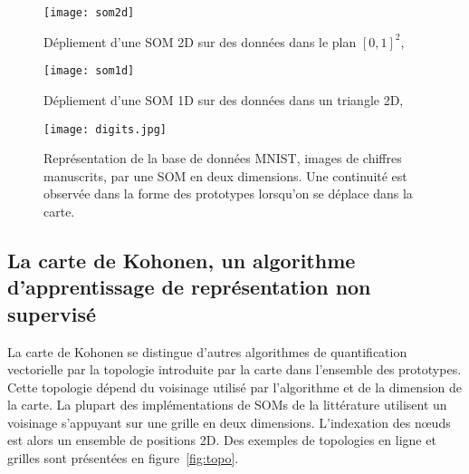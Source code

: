 \documentclass[../main]{subfiles}
\begin{document}
    \begin{figure}
        \centering
        \texttt{[image: som2d]}
        \caption{Dépliement d'une SOM 2D sur des données dans le plan $[0,1]^2$, \cite{Kohonen1995SelfOrganizingM} \label{fig:som2d}}
        \end{figure}
        
        \begin{figure}
        \centering
        \texttt{[image: som1d]}
        \caption{Dépliement d'une SOM 1D sur des données dans un triangle 2D, \cite{Kohonen1995SelfOrganizingM}\label{fig:som1d}}
        \end{figure}

\begin{figure}
    \centering
    \texttt{[image: digits.jpg]}
    \caption{Représentation de la base de données MNIST, images de chiffres manuscrits, par une SOM en deux dimensions. Une continuité est observée dans la forme des prototypes lorsqu'on se déplace dans la carte. \label{fig:digits}}
    \end{figure}
    
    
\subsection{La carte de Kohonen, un algorithme d'apprentissage de représentation non supervisé}

La carte de Kohonen se distingue d'autres algorithmes de quantification vectorielle par la topologie introduite par la carte dans l'ensemble des prototypes. Cette topologie dépend du voisinage utilisé par l'algorithme et de la dimension de la carte.
La plupart des implémentations de SOMs de la littérature utilisent un voisinage s'appuyant sur une grille en deux dimensions. L'indexation des n\oe{}uds est alors un ensemble de positions 2D. Des exemples de topologies en ligne et grilles sont présentées en figure~\ref{fig:topo}. 
\end{document}
